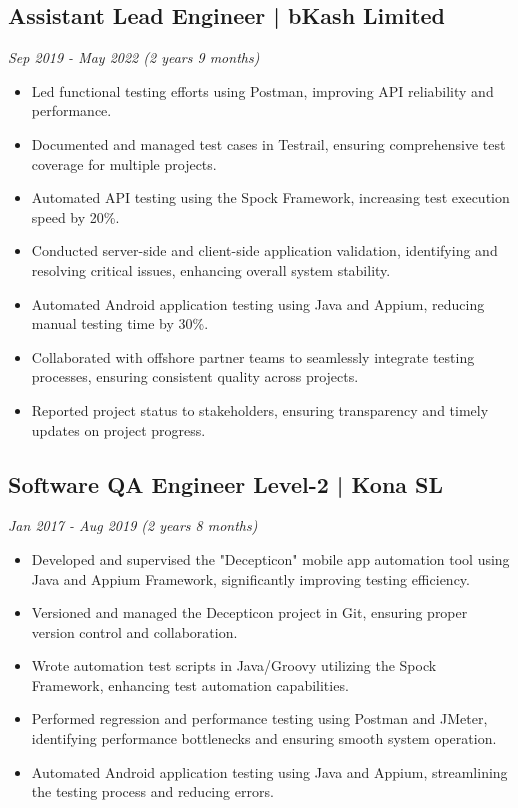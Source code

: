 \documentclass[a4paper,9pt]{article}
\begin{document}
\subsection*{Assistant Lead Engineer | bKash Limited}
\textit{Sep 2019 - May 2022 (2 years 9 months)}
\begin{itemize}
    \item Led functional testing efforts using Postman, improving API reliability and performance.
    \item Documented and managed test cases in Testrail, ensuring comprehensive test coverage for multiple projects.
    \item Automated API testing using the Spock Framework, increasing test execution speed by 20\%.
    \item Conducted server-side and client-side application validation, identifying and resolving critical issues, enhancing overall system stability.
    \item Automated Android application testing using Java and Appium, reducing manual testing time by 30\%.
    \item Collaborated with offshore partner teams to seamlessly integrate testing processes, ensuring consistent quality across projects.
    \item Reported project status to stakeholders, ensuring transparency and timely updates on project progress.
\end{itemize}

\subsection*{Software QA Engineer Level-2 | Kona SL}
\textit{Jan 2017 - Aug 2019 (2 years 8 months)}
\begin{itemize}
    \item Developed and supervised the "Decepticon" mobile app automation tool using Java and Appium Framework, significantly improving testing efficiency.
    \item Versioned and managed the Decepticon project in Git, ensuring proper version control and collaboration.
    \item Wrote automation test scripts in Java/Groovy utilizing the Spock Framework, enhancing test automation capabilities.
    \item Performed regression and performance testing using Postman and JMeter, identifying performance bottlenecks and ensuring smooth system operation.
    \item Automated Android application testing using Java and Appium, streamlining the testing process and reducing errors.
\end{itemize}
\end{document}
